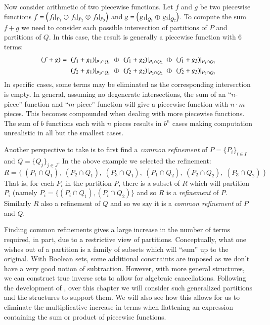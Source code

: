 Now consider arithmetic of two piecewise functions. Let $f$ and $g$ be two piecewise functions
$f = \left(\left.f_1\right|_{P_1} \varobar \left.f_2\right|_{P_2} \varobar \left.f_3\right|_{P_3} \right)$ 
and $g= \left( \left.g_1\right|_{Q_1} \varobar \left.g_2\right|_{Q_2} \right)$.
To compute the sum $f+g$ we need to consider each possible intersection of partitions of $P$ and partitions of $Q$.
In this case, the result is generally a piecewise function with 6 terms:
\begin{align*}
	(f+g) = \;
	&\left.(f_1+g_1)\right|_{P_1 \cap Q_1} 
		\;\varobar\; \left.(f_1+g_2)\right|_{P_1 \cap Q_2} 
		\;\varobar\; \left.(f_1+g_3)\right|_{P_1 \cap Q_3}\notag\\
	&\left.(f_2+g_1)\right|_{P_2 \cap Q_1} 
	 	\;\varobar\; \left.(f_2+g_2)\right|_{P_2 \cap Q_2} 
	 	\;\varobar\; \left.(f_2+g_3)\right|_{P_2 \cap Q_3}
\end{align*}
In specific cases, some terms may be eliminated as the corresponding intersection is empty. 
In general, assuming no degenerate intersections, 
the sum of an ``$n$-piece'' function and ``$m$-piece'' function will give a piecewise function with $n \cdot m$ pieces.
This becomes compounded when dealing with more piecewise functions. 
The sum of $b$ functions each with $n$ pieces results in $b^n$ cases making computation unrealistic 
in all but the smallest cases.


Another perspective to take is to first find a \emph{common refinement} of ${P=\{P_i\}_{i\in I}}$ 
and ${Q=\{Q_j\}_{j\in J}}$. In the above example we selected the refinement:
\begin{equation*}
	R=\Big\{\;
		(P_1 \cap Q_1),\;(P_2 \cap Q_1),\;(P_3 \cap Q_1),\;
		(P_1 \cap Q_2),\;(P_2 \cap Q_2),\;(P_3 \cap Q_2) \;
	\Big\}
\end{equation*}
That is, for each $P_i$ in the partition $P$, there is a subset of $R$ which will partition $P_i$ 
(namely $P_i = \{ (P_i \cap Q_1), (P_i \cap Q_2) \}$ and so $R$ is a \emph{refinement} of $P$.
Similarly $R$ also a refinement of $Q$ and so we say it is a \emph{common refinement} of $P$ and $Q$.


Finding common refinements gives a large increase in the number of terms required, 
in part, due to a restrictive view of partitions.
Conceptually, what one wishes out of a partition is a family of subsets which will ``sum'' up to the original.
With Boolean sets, some additional constraints are imposed as we don't have a very good notion of subtraction.
However, with more general structures, we can construct true inverse sets to allow for algebraic cancellations.
Following the development of \cite{carette2010}, over this chapter we will consider such generalized partitions 
and the structures to support them.
We will also see how this allows for us to eliminate the multiplicative increase in terms when flattening an expression
containing the sum or product of piecewise functions.





